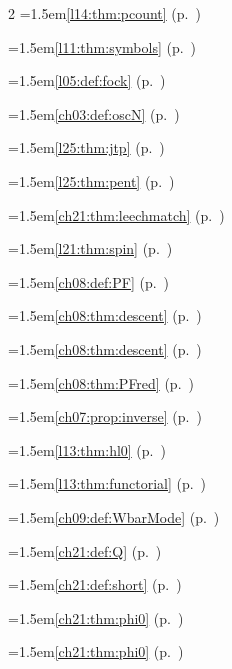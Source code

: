 \begin{multicols}{2}
\hangindent=1.5em\quad \ref{l14:thm:pcount} (p.~\pageref{l14:thm:pcount})\par
\hangindent=1.5em\quad \ref{l11:thm:symbols} (p.~\pageref{l11:thm:symbols})\par
\hangindent=1.5em\quad \ref{l05:def:fock} (p.~\pageref{l05:def:fock})\par
\hangindent=1.5em\quad \ref{ch03:def:oscN} (p.~\pageref{ch03:def:oscN})\par
\hangindent=1.5em\quad \ref{l25:thm:jtp} (p.~\pageref{l25:thm:jtp})\par
\hangindent=1.5em\quad \ref{l25:thm:pent} (p.~\pageref{l25:thm:pent})\par
\hangindent=1.5em\quad \ref{ch21:thm:leechmatch} (p.~\pageref{ch21:thm:leechmatch})\par
\hangindent=1.5em\quad \ref{l21:thm:spin} (p.~\pageref{l21:thm:spin})\par
\hangindent=1.5em\quad \ref{ch08:def:PF} (p.~\pageref{ch08:def:PF})\par
\hangindent=1.5em\quad \ref{ch08:thm:descent} (p.~\pageref{ch08:thm:descent})\par
\hangindent=1.5em\quad \ref{ch08:thm:descent} (p.~\pageref{ch08:thm:descent})\par
\hangindent=1.5em\quad \ref{ch08:thm:PFred} (p.~\pageref{ch08:thm:PFred})\par
\hangindent=1.5em\quad \ref{ch07:prop:inverse} (p.~\pageref{ch07:prop:inverse})\par
\hangindent=1.5em\quad \ref{l13:thm:hl0} (p.~\pageref{l13:thm:hl0})\par
\hangindent=1.5em\quad \ref{l13:thm:functorial} (p.~\pageref{l13:thm:functorial})\par
\hangindent=1.5em\quad \ref{ch09:def:WbarMode} (p.~\pageref{ch09:def:WbarMode})\par
\hangindent=1.5em\quad \ref{ch21:def:Q} (p.~\pageref{ch21:def:Q})\par
\hangindent=1.5em\quad \ref{ch21:def:short} (p.~\pageref{ch21:def:short})\par
\hangindent=1.5em\quad \ref{ch21:thm:phi0} (p.~\pageref{ch21:thm:phi0})\par
\hangindent=1.5em\quad \ref{ch21:thm:phi0} (p.~\pageref{ch21:thm:phi0})\par

\end{multicols}
